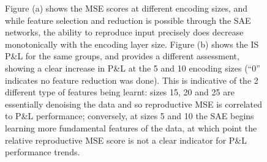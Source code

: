 \documentclass[a4paper,11pt,oneside]{article}
\theoremstyle{plain}
\theoremstyle{definition}
\begin{document}
\begin{figure}[H]
{		\newline Figure (a) shows the MSE scores at different encoding sizes, and while feature selection and reduction is possible through the SAE networks, the ability to reproduce input precisely does decrease monotonically with the encoding layer size. Figure (b) shows the IS P\&L for the same groups, and provides a different assessment, showing a clear increase in P\&L at the 5 and 10 encoding sizes (``0'' indicates no feature reduction was done). This is indicative of the 2 different type of features being learnt: sizes 15, 20 and 25 are essentially denoising the data and so reproductive MSE is correlated to P\&L performance; conversely, at sizes 5 and 10 the SAE begins learning more fundamental features of the data, at which point the relative reproductive MSE score is not a clear indicator for P\&L performance trends.}
	\end{figure}
	
\end{document}
